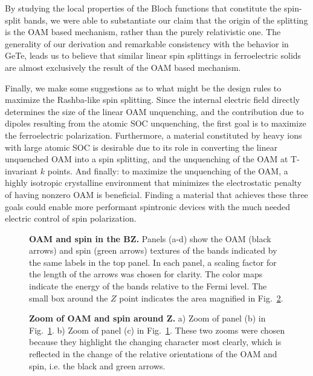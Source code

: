 By studying the local properties of the Bloch functions that constitute the spin-split bands, we were able to substantiate our claim that the origin of the splitting is the OAM based mechanism, rather than the purely relativistic one.
The generality of our derivation and remarkable consistency with the behavior in GeTe, leads us to believe that similar linear spin splittings in ferroelectric solids are almost exclusively the result of the OAM based mechanism.
    
Finally, we make some suggestions as to what might be the design rules to maximize the Rashba-like spin splitting.
Since the internal electric field directly determines the size of the linear OAM unquenching, and the contribution due to dipoles resulting from the atomic SOC unquenching, the first goal is to maximize the ferroelectric polarization.
Furthermore, a material constituted by heavy ions with large atomic SOC is desirable due to its role in converting the linear unquenched OAM into a spin splitting, and the unquenching of the OAM at T-invariant $k$ points.
And finally: to maximize the unquenching of the OAM, a highly isotropic crystalline environment that minimizes the electrostatic penalty of having nonzero OAM is beneficial.
Finding a material that achieves these three goals could enable more performant spintronic devices with the much needed electric control of spin polarization.
\begin{figure}
	\centering
  \caption{\label{fig:Rashba_textures}{\bf OAM and spin in the BZ.} Panels (a-d) show the OAM (black arrows) and spin (green arrows) textures of the bands indicated by the same labels in the top panel. In each panel, a scaling factor for the length of the arrows was chosen for clarity. The color maps indicate the energy of the bands relative to the Fermi level. The small box around the $Z$ point indicates the area magnified in Fig.~\ref{fig:Rashba_textures_small}.}
\end{figure}
\begin{figure}
	\centering
  \caption{\label{fig:Rashba_textures_small}{\bf Zoom of OAM and spin around Z.} a) Zoom of panel (b) in Fig.~\ref{fig:Rashba_textures}. b) Zoom of panel (c) in Fig.~\ref{fig:Rashba_textures}.  These two zooms were chosen because they highlight the changing character most clearly, which is reflected in the change of the relative orientations of the OAM and spin, i.e. the black and green arrows.}
\end{figure}
